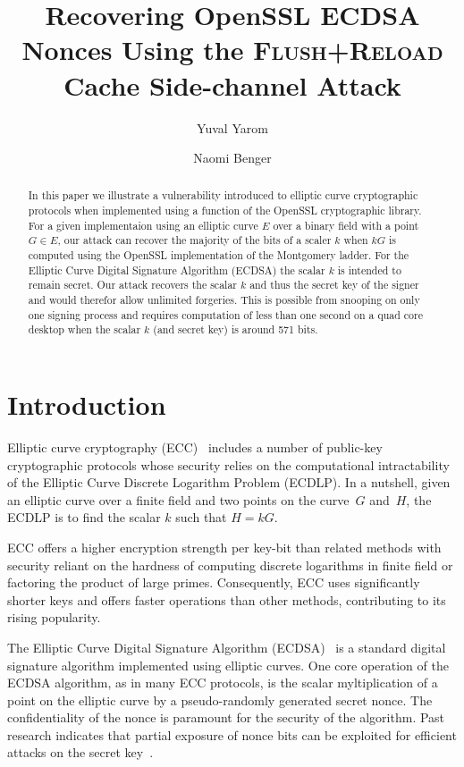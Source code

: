 \documentclass{llncs}
\begin{document}
\title{Recovering OpenSSL ECDSA Nonces Using the \textsc{Flush+Reload} Cache Side-channel Attack}
\author{Yuval Yarom \and Naomi Benger}

\maketitle

\begin{abstract}
In this paper we illustrate a vulnerability introduced to elliptic curve cryptographic protocols when implemented using a function of the OpenSSL cryptographic library. For a given implementaion using an elliptic curve $E$ over a binary field with a point $G\in E$, our attack can recover the majority of the bits of a scaler $k$ when $kG$ is computed using the OpenSSL implementation of the Montgomery ladder. For the Elliptic Curve Digital Signature Algorithm (ECDSA) the scalar $k$ is intended to remain secret. Our attack recovers the scalar $k$ and thus the secret key of the signer and would therefor allow unlimited forgeries. This is possible from snooping on only one signing process and requires computation of less than one second on a quad core desktop when the scalar $k$ (and secret key) is around 571 bits.

\end{abstract}

\section{Introduction}
Elliptic curve cryptography (ECC)~\cite{miller85use,koblitz87elliptic} includes a number of public-key cryptographic protocols whose security relies on the computational intractability of the Elliptic Curve Discrete Logarithm Problem (ECDLP).
In a nutshell, given an elliptic curve over a finite field and two points on the curve~$G$ and~$H$, the ECDLP is to find the scalar $k$ such that $H=kG$.

ECC offers a higher encryption strength per key-bit than related methods with security reliant on the hardness of computing discrete logarithms in finite field or factoring the product of large primes.
Consequently, ECC uses significantly shorter keys and offers faster operations than other methods, contributing to its rising popularity.

The Elliptic Curve Digital Signature Algorithm (ECDSA)~\cite{johnson01elliptic,fips186,ansi962} is a standard
digital signature algorithm implemented using elliptic curves. One core operation of the ECDSA algorithm, as in many ECC protocols, is the scalar myltiplication of a point on the elliptic curve by a pseudo-randomly generated secret nonce. The confidentiality of the nonce is paramount for the security of the algorithm. Past research indicates that partial exposure of nonce bits can be exploited for efficient attacks on the secret key~\cite{nguyen03insecurity,brumley11remote}.
\end{document}
